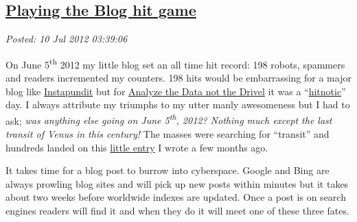 %

\subsection*{\href{https://bakerjd99.wordpress.com/2012/07/09/playing-the-blog-hit-game/}{Playing the Blog hit game}}


\noindent\emph{Posted: 10 Jul 2012 03:39:06}
\vspace{6pt}

On June 5\textsuperscript{th} 2012 my little blog set an all time hit
record: 198 robots, spammers and readers incremented my counters. 198
hits would be embarrassing for a major blog like
\href{http://pjmedia.com/instapundit/}{Instapundit} but for
\href{http://bakerjd99.wordpress.com/}{Analyze the Data not the Drivel}
it was a
``\href{http://www.samizdata.net/blog/glossary\_archives/2002/09/hitnosis.html}{hitnotic}''
day. I always attribute my triumphs to my utter manly awesomeness but I
had to ask; \emph{was anything else going on June 5\textsuperscript{th},
2012? Nothing much except the last transit of Venus in this century!} The
masses were searching for ``transit'' and hundreds landed on this
\href{http://bakerjd99.wordpress.com/2012/04/22/2012-venus-transit-and-annular-eclipse/}{little
entry} I wrote a few months ago.

It takes time for a blog post to burrow into cyberspace. Google and Bing
are always prowling blog sites and will pick up new posts within minutes
but it takes about two weeks before worldwide indexes are updated. Once
a post is on search engines readers will find it and when they do it
will meet one of these three fates.

